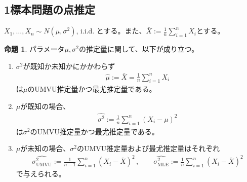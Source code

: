 \documentclass[11pt]{ltjsarticle}
\theoremstyle{definition}
\newtheorem{proposition}[theorem]{命題}
\begin{document}
\subsection{1標本問題の点推定}
$X_1,\ldots,X_n \sim N(\mu, \sigma^2)$, i.i.d. とする。また、$\bar{X} := \frac{1}{n}\sum_{i=1}^n X_i$とする。
\begin{proposition}
    パラメータ$\mu,\sigma^2$の推定量に関して、以下が成り立つ。
    \begin{enumerate}[(1)]
        \item $\sigma^2$が既知か未知かにかかわらず
        \begin{align}
            \widehat{\mu} := \bar{X} = \frac{1}{n}\sum_{i=1}^n X_i
        \end{align}
        は$\mu$のUMVU推定量かつ最尤推定量である。
        \item $\mu$が既知の場合、
        \begin{align}
            \widehat{\sigma^2} :=\frac{1}{n}\sum_{i=1}^n(X_i - \mu)^2
        \end{align}
        は$\sigma^2$のUMVU推定量かつ最尤推定量である。
        \item $\mu$が未知の場合、$\sigma^2$のUMVU推定量および最尤推定量はそれぞれ
        \begin{align}
            \widehat{\sigma^2_{\text{UMVU}}} :=\frac{1}{n-1}\sum_{i=1}^n(X_i-\bar{X})^2\, , \qquad \widehat{\sigma^2_{\text{MLE}}} :=\frac{1}{n}\sum_{i=1}^n(X_i-\bar{X})^2
        \end{align}
        で与えられる。
    \end{enumerate}
\end{proposition}
\end{document}
